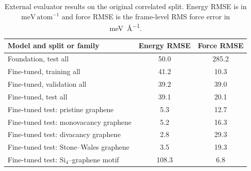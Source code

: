\begin{table}[!htbp]
  \centering
  \caption{External evaluator results on the original correlated split.
  Energy RMSE is in \(\mathrm{meV}\,\mathrm{atom}^{-1}\) and force RMSE is the frame-level RMS
  force error in \si{\milli\electronvolt\per\angstrom}.}
  \label{tab:si_mace_errors}
  \begin{tabular}{lcc}
    \toprule
    Model and split or family & Energy RMSE & Force RMSE \\
    \midrule
    Foundation, test all & 50.0 & 285.2 \\
    Fine-tuned, training all & 41.2 & 10.3 \\
    Fine-tuned, validation all & 39.2 & 39.0 \\
    Fine-tuned, test all & 39.1 & 20.1 \\
    Fine-tuned test: pristine graphene & 5.3 & 12.7 \\
    Fine-tuned test: monovacancy graphene & 5.2 & 16.3 \\
    Fine-tuned test: divacancy graphene & 2.8 & 29.3 \\
    Fine-tuned test: Stone--Wales graphene & 3.5 & 19.3 \\
    Fine-tuned test: Si$_4$--graphene motif & 108.3 & 6.8 \\
    \bottomrule
  \end{tabular}
\end{table}
